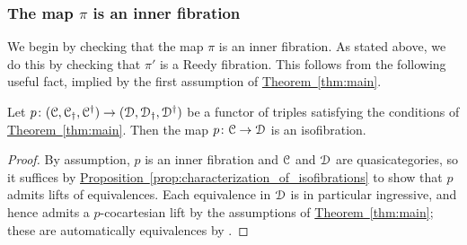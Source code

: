 \documentclass[main.tex]{subfiles}
\begin{document}
\subsubsection{The map \texorpdfstring{$\pi$}{pi} is an inner fibration}

We begin by checking that the map $\pi$ is an inner fibration. As stated above, we do this by checking that $\pi'$ is a Reedy fibration. This follows from the following useful fact, implied by the first assumption of \hyperref[thm:main]{Theorem~\ref*{thm:main}}.
\begin{lemma}
  Let $p\colon (\mathcal{C}, \mathcal{C}_{\dagger}, \mathcal{C}^{\dagger}) \to (\mathcal{D}, \mathcal{D}_{\dagger}, \mathcal{D}^{\dagger})$ be a functor of triples satisfying the conditions of \hyperref[thm:main]{Theorem~\ref*{thm:main}}. Then the map $p\colon \mathcal{C} \to \mathcal{D}$ is an isofibration.
\end{lemma}
\begin{proof}
  By assumption, $p$ is an inner fibration and $\mathcal{C}$ and $\mathcal{D}$ are quasicategories, so it suffices by \hyperref[prop:characterization_of_isofibrations]{Proposition~\ref*{prop:characterization_of_isofibrations}} to show that $p$ admits lifts of equivalences. Each equivalence in $\mathcal{D}$ is in particular ingressive, and hence admits a $p$-cocartesian lift by the assumptions of \hyperref[thm:main]{Theorem~\ref*{thm:main}}; these are automatically equivalences by \cite[Prop.~2.4.1.5]{highertopostheory}.
\end{proof}
\end{document}

